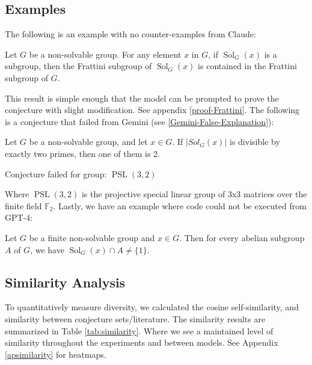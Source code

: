 \documentclass{article}
\begin{document}
\subsection{Examples}
The following is an example with no counter-examples from Claude: 
\begin{conj}
    \label{conj-Frattini}
    Let \(G\) be a non-solvable group. For any element \(x\) in \(G\), if \(\operatorname{Sol}_G(x)\) is a subgroup, then the Frattini subgroup of \(\operatorname{Sol}_G(x)\) is contained in the Frattini subgroup of \(G\). 
\end{conj}
This result is simple enough that the model can be prompted to prove the conjecture with slight modification. See appendix \ref{proof-Frattini}. The following is a conjecture that failed from Gemini (see \ref{Gemini-False-Explanation}):
\begin{conj}\label{Gemini-False}
    Let \(G\) be a non-solvable group, and let \(x \in G\). If \(|Sol_G(x)|\)  is divisible by exactly two primes, then one of them is  2.
\end{conj}
\begin{codeout}
    Conjecture failed for group: \(\operatorname{PSL}(3,2)\)
\end{codeout}
Where \(\operatorname{PSL}(3,2)\) is the projective special linear group of 3x3 matrices over the finite field \(\mathbb{F}_2\). Lastly, we have an example where code could not be executed from GPT-4:
\begin{conj}
    Let \( G \) be a finite non-solvable group and \( x \in G \). Then for every abelian subgroup \( A \) of \( G \), we have \( \operatorname{Sol}_G(x) \cap A \neq \{1\} \).
\end{conj}

\subsection{Similarity Analysis}
To quantitatively measure diversity, we calculated the cosine self-similarity, and similarity between conjecture sets/literature. The similarity results are summarized in Table \ref{tab:similarity}. Where we see a maintained level of similarity throughout the experiments and between models. See Appendix \ref{apsimilarity} for heatmaps. 
\end{document}
